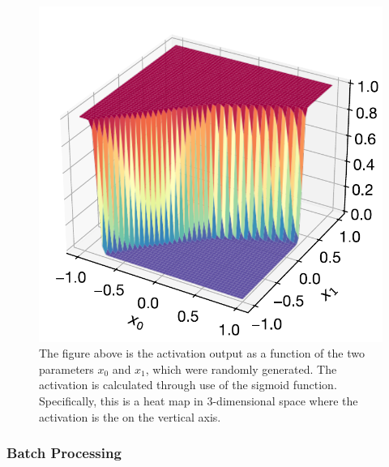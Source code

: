 \begin{figure}[H]
\centering
\includegraphics[scale=0.65]{../figures/activation_3d.pdf}
\caption{The figure above is the activation output as a function of the two parameters $x_0$ and $x_1$, which were randomly generated. The activation is calculated through use of the sigmoid function. Specifically, this is a heat map in 3-dimensional space where the activation is the on the vertical axis.}
\end{figure}

\subsubsection{Batch Processing}

